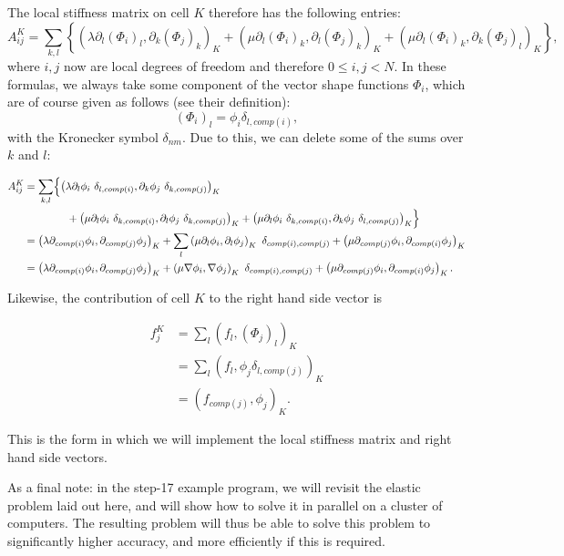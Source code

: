 \documentclass{article}
\begin{document}
The local stiffness matrix on cell $K$ therefore has the following entries:
$$
  A^K_{ij}
  =
  \sum_{k,l}
  \left\{
  \left(
    \lambda \partial_l (\Phi_i)_l, \partial_k (\Phi_j)_k
  \right)_K
  +
  \left(
    \mu \partial_l (\Phi_i)_k, \partial_l (\Phi_j)_k
  \right)_K
  +
  \left(
    \mu \partial_l (\Phi_i)_k, \partial_k (\Phi_j)_l
  \right)_K
  \right\},
$$
where $i,j$ now are local degrees of freedom and therefore $0\le i,j < N$. 
In these formulas, we always take some component of the vector shape functions
$\Phi_i$, which are of course given as follows (see their definition):
$$
  (\Phi_i)_l = \phi_i \delta_{l,comp(i)},
$$
with the Kronecker symbol $\delta_{nm}$. Due to this, we can delete some of
the sums over $k$ and $l$:
\begin{center}
\begin{align*}
  A^K_{ij}
  &=
  \sum_{k,l}
  \Bigl\{
  \left(
    \lambda \partial_l \phi_i\ \delta_{l,comp(i)}, 
            \partial_k \phi_j\ \delta_{k,comp(j)}
  \right)_K
\\
  &\qquad\qquad +
  \left(
    \mu \partial_l \phi_i\ \delta_{k,comp(i)},
        \partial_l \phi_j\ \delta_{k,comp(j)}
  \right)_K
  +
  \left(
    \mu \partial_l \phi_i\ \delta_{k,comp(i)},
        \partial_k \phi_j\ \delta_{l,comp(j)}
  \right)_K
  \Bigr\}
\\
  &=
  \left(
    \lambda \partial_{comp(i)} \phi_i,
            \partial_{comp(j)} \phi_j
  \right)_K
  +
  \sum_l
  \left(
    \mu \partial_l \phi_i,
        \partial_l \phi_j
  \right)_K
  \ \delta_{comp(i),comp(j)}
  +
  \left(
    \mu \partial_{comp(j)} \phi_i,
        \partial_{comp(i)} \phi_j
  \right)_K
\\
  &=
  \left(
    \lambda \partial_{comp(i)} \phi_i,
            \partial_{comp(j)} \phi_j
  \right)_K
  +
  \left(
    \mu \nabla \phi_i,
        \nabla \phi_j
  \right)_K
  \ \delta_{comp(i),comp(j)}
  +
  \left(
    \mu \partial_{comp(j)} \phi_i,
        \partial_{comp(i)} \phi_j
  \right)_K.
\end{align*}
\end{center}

Likewise, the contribution of cell $K$ to the right hand side vector is
\begin{center}
\begin{align*}
  f^K_j
  &=
  \sum_l
  \left(
    f_l,
    (\Phi_j)_l
  \right)_K
\\
  &=
  \sum_l
  \left(
    f_l,
    \phi_j \delta_{l,comp(j)}
  \right)_K
\\
  &=
  \left(
    f_{comp(j)},
    \phi_j
  \right)_K.
\end{align*}  
\end{center}

This is the form in which we will implement the local stiffness matrix and
right hand side vectors.

As a final note: in the step-17 example program, we will revisit the elastic
problem laid out here, and will show how to solve it in parallel on a cluster
of computers. The resulting problem will thus be able to solve this problem to
significantly higher accuracy, and more efficiently if this is required.
\end{document}
